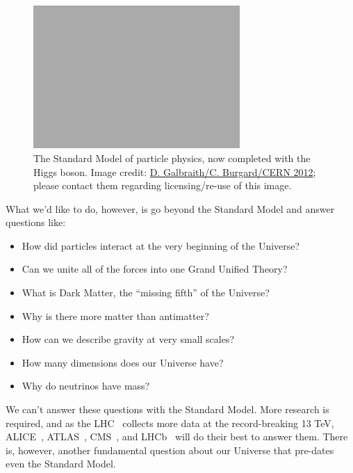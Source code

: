 \clearpage

%
\begin{figure}[htbp]
  \centering
  \includegraphics[width=0.7\textwidth]{assets/images/sm/sm.jpg}
  \caption[The Standard Model of particle physics]
  {\label{fig:standardmodel}The Standard Model of particle physics, now %
completed with the Higgs boson. %
Image credit: \href{https://cds.cern.ch/journal/CERNBulletin/2012/35/News Articles/1473657}{D. Galbraith/C. Burgard/CERN 2012}; %
please contact them regarding licensing/re-use of this image.}
\end{figure}
%

What we'd like to do, however, is go beyond the Standard Model and
answer questions like:
\begin{itemize}
\item How did particles interact at the very beginning of the Universe?
\item Can we unite all of the forces into one Grand Unified Theory?
\item What is Dark Matter, the ``missing fifth'' of the Universe?
\item Why is there more matter than antimatter?
\item How can we describe gravity at very small scales?
\item How many dimensions does our Universe have?
\item Why do neutrinos have mass?
\end{itemize}
We can't answer these questions with the Standard Model.
More research is required, and as the \acs{LHC}~\cite{LHC2008} collects
more data at the record-breaking 13 \ac{TeV},
\acs{ALICE}~\cite{ALICE2008},
\acs{ATLAS}~\cite{ATLAS2008},
\acs{CMS}~\cite{CMS2008},
and
\acs{LHCb}~\cite{LHCb2008}
will do their best to answer them.
There is, however, another fundamental question about our Universe
that pre-dates even the Standard Model.

